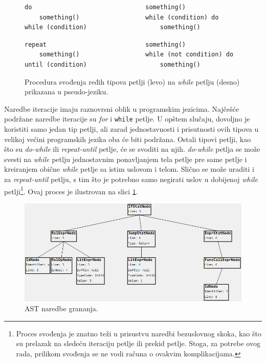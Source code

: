 \begin{figure}[h!]
\begin{lstlisting}
do                               something()
    something()                  while (condition) do
while (condition)                    something()
\end{lstlisting}
\begin{lstlisting}
repeat                           something()
    something()                  while (not condition) do
until (condition)                    something()
\end{lstlisting}
\caption{Procedura svođenja ređih tipova petlji (levo) na \emph{while} petlju (desno) prikazana u pseudo-jeziku.}
\label{fig:ASTIterationStatements}
\end{figure}

Naredbe iteracije imaju raznovrsni oblik u programskim jezicima. Najčešće podržane naredbe iteracije su \emph{for} i \texttt{while} petlje. U opštem slučaju, dovoljno je koristiti samo jedan tip petlji, ali zarad jednostavnosti i prisutnosti ovih tipova u velikoj većini programskih jezika oba će biti podržana. Ostali tipovi petlji, kao što su \emph{do-while} ili \emph{repeat-until} petlje, će se svoditi na njih. \emph{do-while} petlja se može svesti na \emph{while} petlju jednostavnim ponavljanjem tela petlje pre same petlje i kreiranjem obične \emph{while} petlje sa istim uslovom i telom. Slično se može uraditi i za \emph{repeat-until} petlju, s tim što je potrebno samo negirati uslov u dobijenoj \emph{while} petlji\footnote{Proces svođenja je znatno teži u prisustvu naredbi bezuslovnog skoka, kao što su prelazak na sledeću iteraciju petlje ili prekid petlje. Stoga, za potrebe ovog rada, prilikom svođenja se ne vodi računa o ovakvim komplikacijama.}. Ovaj proces je ilustrovan na slici \ref{fig:ASTIterationStatements}. 

\begin{figure}[h!]
\centering
\includegraphics[scale=0.7]{images/ast_stat.png}
\caption{AST naredbe grananja.}
\label{fig:MyASTExampleStatement}
\end{figure}
